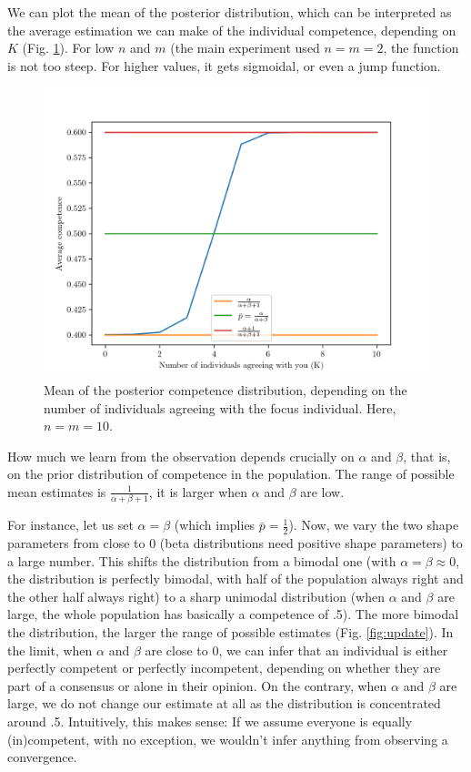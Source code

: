 \documentclass[
  doc,floatsintext]{apa6}
\begin{document}
We can plot the mean of the posterior distribution, which can be interpreted as the average estimation we can make of the individual competence, depending on \(K\) (Fig. \ref{fig:competence-k}). For low \(n\) and \(m\) (the main experiment used \(n=m=2\), the function is not too steep. For higher values, it gets sigmoidal, or even a jump function.



\begin{figure}

\includegraphics[width=0.75\linewidth]{figures/Benoit_competence_k} \hfill{}

\caption{Mean of the posterior competence distribution, depending on the number of individuals agreeing with the focus individual. Here, \(n=m=10\).}\label{fig:competence-k}
\end{figure}

How much we learn from the observation depends crucially on \(\alpha\) and \(\beta\), that is, on the prior distribution of competence in the population. The range of possible mean estimates is \(\frac{1}{\alpha+\beta + 1}\), it is larger when \(\alpha\) and \(\beta\) are low.

For instance, let us set \(\alpha=\beta\) (which implies \(\bar p = \frac 12\)). Now, we vary the two shape parameters from close to 0 (beta distributions need positive shape parameters) to a large number. This shifts the distribution from a bimodal one (with \(\alpha=\beta \approx 0\), the distribution is perfectly bimodal, with half of the population always right and the other half always right) to a sharp unimodal distribution (when \(\alpha\) and \(\beta\) are large, the whole population has basically a competence of .5). The more bimodal the distribution, the larger the range of possible estimates (Fig. \ref{fig:update}). In the limit, when \(\alpha\) and \(\beta\) are close to 0, we can infer that an individual is either perfectly competent or perfectly incompetent, depending on whether they are part of a consensus or alone in their opinion. On the contrary, when \(\alpha\) and \(\beta\) are large, we do not change our estimate at all as the distribution is concentrated around .5. Intuitively, this makes sense: If we assume everyone is equally (in)competent, with no exception, we wouldn't infer anything from observing a convergence.
\end{document}
